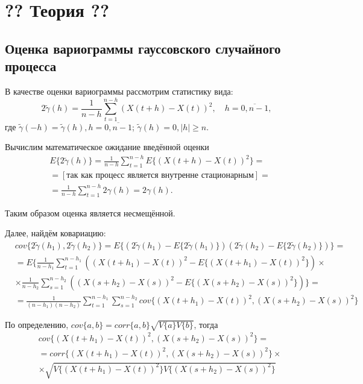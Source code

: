 \newpage

\chapter{?? Теория ??}
\label{c:theory}

\section{Оценка вариограммы гауссовского случайного процесса} %
\label{sec:variogram_theory}

В качестве оценки вариограммы рассмотрим статистику вида:
\begin{equation}
	\label{eq:var_est}
	2 \tilde{\gamma}(h) = \frac{1}{n - h} \sum_{t = 1}^{n - h}(X(t + h) - X(t))^2, \quad h = \overline{0, n - 1},
\end{equation}
где $ \tilde{\gamma}(-h) = \tilde{\gamma}(h), h = \overline{0, n - 1}$; $ \tilde{\gamma}(h) = 0, |h| \ge n $.

Вычислим математическое ожидание введённой оценки
\begin{eqnarray*}
	& E \{ 2 \tilde{\gamma}(h) \} = \frac{1}{n - h} \sum_{t = 1}^{n - h} E \{ (X(t + h) - X(t))^2 \} = \\
	& = [\text{так как процесс является внутренне стационарным}] = \\ %
	& = \frac{1}{n - h} \sum_{t = 1}^{n - h} 2 \gamma(h) = 2 \gamma(h).
\end{eqnarray*}

Таким образом оценка является несмещённой.

Далее, найдём ковариацию:
\begin{eqnarray}
\label{eq:cov_support}
\nonumber
	& cov\{ 2 \tilde{\gamma}(h_1), 2 \tilde{\gamma}(h_2) \} = E\{ (2 \tilde{\gamma}(h_1) - E\{ 2 \tilde{\gamma}(h_1) \}) (2 \tilde{\gamma}(h_2) - E\{ 2 \tilde{\gamma}(h_2) \}) \} = \\
\nonumber
	& = E\{ \frac{1}{n - h_1} \sum_{t = 1}^{n - h_1}((X(t + h_1) - X(t))^2 - E\{ (X(t + h_1) - X(t))^2 \}) \times \\
\nonumber
	& \times \frac{1}{n - h_2} \sum_{s = 1}^{n - h_2}((X(s + h_2) - X(s))^2 - E\{ (X(s + h_2) - X(s))^2 \}) \} = \\
	& = \frac{1}{(n - h_1)(n - h_2)} \sum_{t = 1}^{n - h_1}\sum_{s = 1}^{n - h_2} cov\{ (X(t + h_1) - X(t))^2, (X(s + h_2) - X(s))^2 \}
\end{eqnarray}

По определению, $ cov\{ a, b \} = corr\{ a, b \} \sqrt{ V\{ a \} V\{ b \} } $, тогда
\begin{eqnarray*}
	& cov\{ (X(t + h_1) - X(t))^2, (X(s + h_2) - X(s))^2 \} = \\
	& = corr\{(X(t + h_1) - X(t))^2, (X(s + h_2) - X(s))^2 \} \times \\
	& \times \sqrt{V\{ (X( t + h_1) - X(t))^2 \} V\{ (X(s + h_2) - X(s))^2 \}}
\end{eqnarray*}

